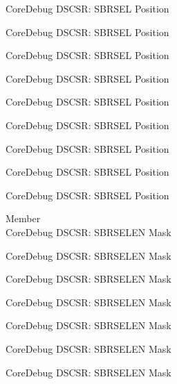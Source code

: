 \begin{DoxyRefList}
\label{deprecated__deprecated000648}%
%
Core\+Debug DSCSR\+: SBRSEL Position 

\label{deprecated__deprecated000754}%
%
Core\+Debug DSCSR\+: SBRSEL Position 

\label{deprecated__deprecated000808}%
%
Core\+Debug DSCSR\+: SBRSEL Position 

\label{deprecated__deprecated000884}%
%
Core\+Debug DSCSR\+: SBRSEL Position 

\label{deprecated__deprecated000947}%
%
Core\+Debug DSCSR\+: SBRSEL Position 

\label{deprecated__deprecated001026}%
%
Core\+Debug DSCSR\+: SBRSEL Position 

\label{deprecated__deprecated001102}%
%
Core\+Debug DSCSR\+: SBRSEL Position 

\label{deprecated__deprecated001205}%
%
Core\+Debug DSCSR\+: SBRSEL Position 

\label{deprecated__deprecated001307}%
%
Core\+Debug DSCSR\+: SBRSEL Position  
\item[Member \doxylink{group___c_m_s_i_s___s_c_b_ga5e5ed94cac1139165af161c008881805}{Core\+Debug\+\_\+\+DSCSR\+\_\+\+SBRSELEN\+\_\+\+Msk} ]\hfill \\
\label{deprecated__deprecated000098}%
%
Core\+Debug DSCSR\+: SBRSELEN Mask 

\label{deprecated__deprecated000152}%
%
Core\+Debug DSCSR\+: SBRSELEN Mask 

\label{deprecated__deprecated000228}%
%
Core\+Debug DSCSR\+: SBRSELEN Mask 

\label{deprecated__deprecated000291}%
%
Core\+Debug DSCSR\+: SBRSELEN Mask 

\label{deprecated__deprecated000370}%
%
Core\+Debug DSCSR\+: SBRSELEN Mask 

\label{deprecated__deprecated000446}%
%
Core\+Debug DSCSR\+: SBRSELEN Mask 

\label{deprecated__deprecated000549}%
%
Core\+Debug DSCSR\+: SBRSELEN Mask 


\end{DoxyRefList}
